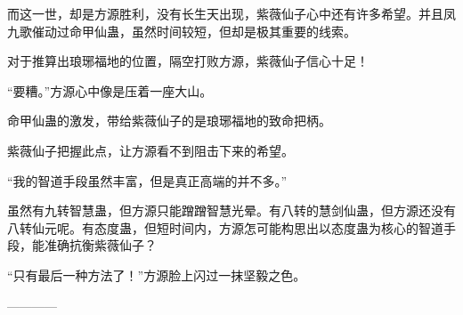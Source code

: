 \begin{this_body}
而这一世，却是方源胜利，没有长生天出现，紫薇仙子心中还有许多希望。并且凤九歌催动过命甲仙蛊，虽然时间较短，但却是极其重要的线索。

对于推算出琅琊福地的位置，隔空打败方源，紫薇仙子信心十足！

“要糟。”方源心中像是压着一座大山。

命甲仙蛊的激发，带给紫薇仙子的是琅琊福地的致命把柄。

紫薇仙子把握此点，让方源看不到阻击下来的希望。

“我的智道手段虽然丰富，但是真正高端的并不多。”

虽然有九转智慧蛊，但方源只能蹭蹭智慧光晕。有八转的慧剑仙蛊，但方源还没有八转仙元呢。有态度蛊，但短时间内，方源怎可能构思出以态度蛊为核心的智道手段，能准确抗衡紫薇仙子？

“只有最后一种方法了！”方源脸上闪过一抹坚毅之色。

------------

\end{this_body}


